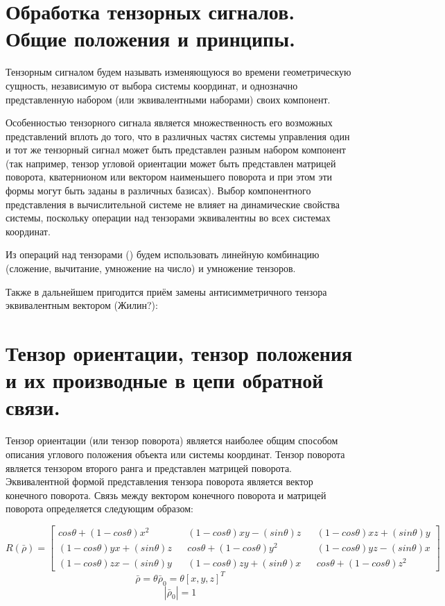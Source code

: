 \documentclass[a4paper]{article}
\begin{document}
\section{Обработка тензорных сигналов. Общие положения и принципы.}
Тензорным сигналом будем называть изменяющуюся во времени геометрическую сущность, независимую от выбора системы координат, и однозначно представленную набором (или эквивалентными наборами) своих компонент. 

Особенностью тензорного сигнала является множественность его возможных представлений вплоть до того, что в различных частях системы управления один и тот же тензорный сигнал может быть представлен разным набором компонент (так например, тензор угловой ориентации может быть представлен матрицей поворота, кватернионом или вектором наименьшего поворота и при этом эти формы могут быть заданы в различных базисах). Выбор компонентного представления в вычислительной системе не влияет на динамические свойства системы, поскольку операции над тензорами эквивалентны во всех системах координат.

Из операций над тензорами () будем использовать линейную комбинацию (сложение, вычитание, умножение на число) и умножение тензоров.

Также в дальнейшем пригодится приём замены антисимметричного тензора эквивалентным вектором (Жилин?):

\section{Тензор ориентации, тензор положения и их производные в цепи обратной связи. }
Тензор ориентации (или тензор поворота) является наиболее общим способом описания углового положения объекта или системы координат. Тензор поворота является тензором второго ранга и представлен матрицей поворота. Эквивалентной формой представления тензора поворота является вектор конечного поворота. Связь между вектором конечного поворота и матрицей поворота определяется следующим образом:

\begin{equation}
R(\bar{\rho}) = 
\begin{bmatrix}
cos\theta+(1-cos\theta)x^2   && (1-cos\theta)xy-(sin\theta)z && (1-cos\theta)xz + (sin\theta)y\\
(1-cos\theta)yx+(sin\theta)z && cos\theta+(1-cos\theta)y^2   && (1-cos\theta)yz - (sin\theta)x\\
(1-cos\theta)zx-(sin\theta)y && (1-cos\theta)zy+(sin\theta)x && cos\theta+(1-cos\theta)z^2
\end{bmatrix}
\end{equation}
\begin{equation} \bar{\rho} = \theta \bar{\rho}_0 = \theta [x,y,z]^T 	\end{equation}
\begin{equation} |\bar{\rho}_0| = 1 									\end{equation}
\end{document}
